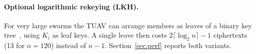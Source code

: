 \paragraph{Optional logarithmic rekeying (LKH).} For very large swarms the TUAV can arrange members as leaves of a binary key tree~\cite{lkh}, using
$K_i$ as leaf keys. A single leave then costs $2\lceil\log_2 n\rceil-1$ ciphertexts (13 for $n=120$) instead of $n-1$. Section~\ref{sec:perf}
reports both variants.
